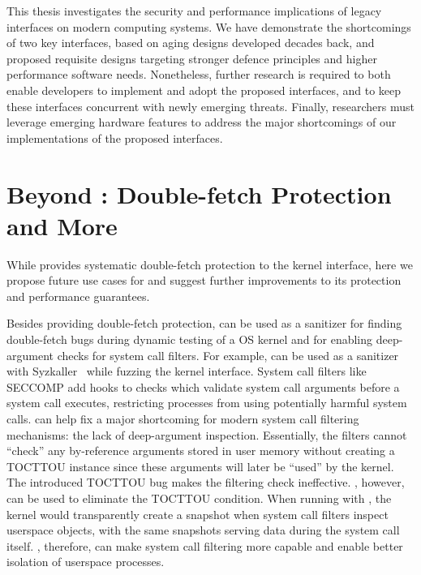 This thesis investigates the security and performance implications of
legacy interfaces on modern computing systems.
We have demonstrate the shortcomings of two key interfaces, 
based on aging designs developed decades back, and
proposed requisite designs targeting stronger defence principles and 
higher performance software needs.
Nonetheless, further research is required to both enable developers to
implement and adopt the proposed interfaces, 
and to keep these interfaces concurrent with newly emerging threats.
Finally, researchers must leverage emerging hardware features to address
the major shortcomings of our implementations of the proposed interfaces.

\section{Beyond \midas: Double-fetch Protection and More}
\label{sec:conclusion:midas}
While \midas provides systematic double-fetch protection to the 
kernel interface,
here we propose future use cases for \midas and 
suggest further improvements to its protection and performance 
guarantees.

Besides providing double-fetch protection, \midas can be used as a 
sanitizer for finding double-fetch bugs during dynamic testing of a
OS kernel and for enabling deep-argument checks for system call filters.
For example, \midas can be used as a sanitizer with 
Syzkaller~\cite{vyukov2019syzkaller} while fuzzing the kernel interface.
System call filters like SECCOMP add hooks to checks which validate
system call arguments before a system call executes, 
restricting processes from using potentially harmful system calls.
\midas can help fix a major shortcoming for modern system call
filtering mechanisms: the lack of deep-argument inspection.
Essentially, the filters cannot ``check'' any by-reference arguments stored
in user memory without creating a TOCTTOU instance since these arguments
will later be ``used'' by the kernel.
The introduced TOCTTOU bug makes the filtering check ineffective.
\midas, however, can be used to eliminate the TOCTTOU condition.
When running with \midas, the kernel would transparently create a snapshot 
when system call filters inspect userspace objects, with the same
snapshots serving data during the system call itself.
\midas, therefore, can make system call filtering more capable and
enable better isolation of userspace processes.

